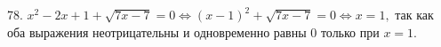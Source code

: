 78. $x^2-2x+1+\sqrt{7x-7}=0 \Leftrightarrow (x-1)^2+\sqrt{7x-7}=0 \Leftrightarrow x=1,$ так как оба выражения неотрицательны и одновременно равны 0 только при $x=1.$\\
